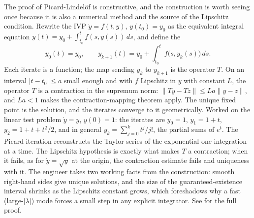 \begin{mastery}
The proof of Picard-Lindel\"of is constructive, and the
construction is worth seeing once because it is also a numerical
method and the source of the Lipschitz condition. Rewrite the IVP
$\dot{y} = f(t, y)$, $y(t_{0}) = y_{0}$ as the equivalent integral
equation $y(t) = y_{0} + \int_{t_{0}}^{t} f(s, y(s))\,ds$, and define
the 
\[
y_{0}(t) = y_{0}, \qquad y_{k+1}(t) = y_{0} + \int_{t_{0}}^{t}
f\bigl(s, y_{k}(s)\bigr)\,ds.
\]
Each iterate is a function; the map sending $y_{k}$ to $y_{k+1}$ is
the operator $T$. On an interval $|t - t_{0}| \leq a$ small enough
and with $f$ Lipschitz in $y$ with constant $L$, the operator $T$
is a contraction in the supremum norm: $\|T y - T z\| \leq L a
\|y - z\|$, and $L a < 1$ makes the contraction-mapping theorem
apply. The unique fixed point is the solution, and the iterates
converge to it geometrically. Worked on the linear test problem
$\dot{y} = y$, $y(0) = 1$: the iterates are $y_{0} = 1$,
$y_{1} = 1 + t$, $y_{2} = 1 + t + t^{2}/2$, and in general
$y_{k} = \sum_{j=0}^{k} t^{j}/j!$, the partial sums of $e^{t}$. The
Picard iteration reconstructs the Taylor series of the exponential
one integration at a time. The Lipschitz hypothesis is exactly what
makes $T$ a contraction; when it fails, as for $\dot{y} = \sqrt{y}$
at the origin, the contraction estimate fails and uniqueness with
it. The engineer takes two working facts from the construction:
smooth right-hand sides give unique solutions, and the size of the
guaranteed-existence interval shrinks as the Lipschitz constant
grows, which foreshadows why a fast (large-$|\lambda|$) mode forces
a small step in any explicit integrator. See
\textcite{text:boyce-diprima} for the full proof.
\end{mastery}

